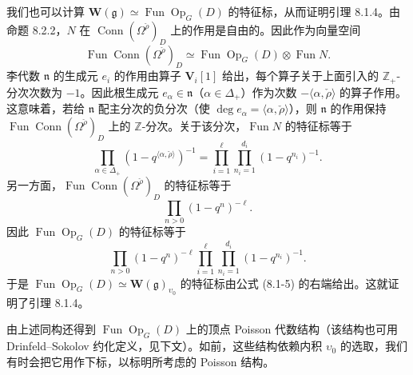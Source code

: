 我们也可以计算 $\mathbf W(\mathfrak g)\simeq\operatorname{Fun}\operatorname{Op}_G(D)$ 的特征标，从而证明引理 8.1.4。由命题 8.2.2，$N$ 在 $\operatorname{Conn}(\Omega^{\check\rho})_D$ 上的作用是自由的。因此作为向量空间
\[
    \operatorname{Fun}\operatorname{Conn}(\Omega^{\check\rho})_D\simeq\operatorname{Fun}\operatorname{Op}_G(D)\otimes\operatorname{Fun}N.
\]
李代数 $\mathfrak n$ 的生成元 $e_i$ 的作用由算子 $\mathbf V_i[1]$ 给出，每个算子关于上面引入的 $\mathbb Z_+$-分次次数为 $-1$。因此根生成元 $e_\alpha\in\mathfrak n$（$\alpha\in\Delta_+$）作为次数 $-\langle\alpha,\check\rho\rangle$ 的算子作用。这意味着，若给 $\mathfrak n$ 配主分次的负分次（使 $\deg e_\alpha=\langle\alpha,\check\rho\rangle$），则 $\mathfrak n$ 的作用保持 $\operatorname{Fun}\operatorname{Conn}(\Omega^{\check\rho})_D$ 上的 $\mathbb Z$-分次。关于该分次，$\operatorname{Fun}N$ 的特征标等于
\[
    \prod_{\alpha\in\Delta_+}(1-q^{\langle\alpha,\check\rho\rangle})^{-1}=\prod_{i=1}^{\ell}\prod_{n_i=1}^{d_i}(1-q^{n_i})^{-1}.
\]
另一方面，$\operatorname{Fun}\operatorname{Conn}(\Omega^{\check\rho})_D$ 的特征标等于
\[
    \prod_{n>0}(1-q^n)^{-\ell}.
\]
因此 $\operatorname{Fun}\operatorname{Op}_G(D)$ 的特征标等于
\[
    \prod_{n>0}(1-q^n)^{-\ell}\prod_{i=1}^{\ell}\prod_{n_i=1}^{d_i}(1-q^{n_i})^{-1}.
\]
于是 $\operatorname{Fun}\operatorname{Op}_G(D)\simeq\mathbf W(\mathfrak g)_{\upsilon_0}$ 的特征标由公式 (8.1-5) 的右端给出。这就证明了引理 8.1.4。

由上述同构还得到 $\operatorname{Fun}\operatorname{Op}_G(D)$ 上的顶点 Poisson 代数结构（该结构也可用 Drinfeld–Sokolov 约化定义，见下文）。如前，这些结构依赖内积 $\upsilon_0$ 的选取，我们有时会把它用作下标，以标明所考虑的 Poisson 结构。


